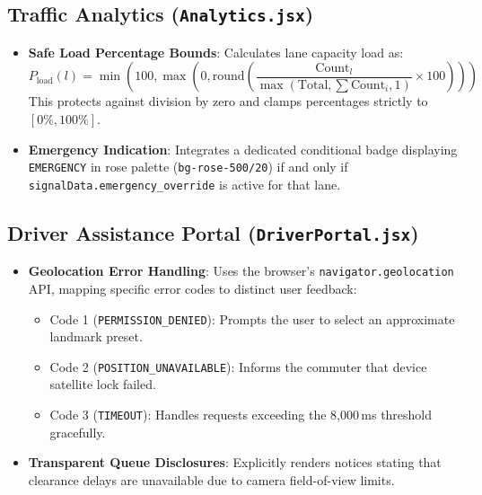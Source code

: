 \subsection{Traffic Analytics (\texttt{Analytics.jsx})}
\begin{itemize}[leftmargin=*]
    \item \textbf{Safe Load Percentage Bounds}: Calculates lane capacity load as:
    \begin{equation}
    P_{\text{load}}(l) = \min\left(100, \max\left(0, \text{round}\left(\frac{\text{Count}_l}{\max(\text{Total}, \sum \text{Count}_i, 1)} \times 100\right)\right)\right)
    \end{equation}
    This protects against division by zero and clamps percentages strictly to $[0\%, 100\%]$.
    \item \textbf{Emergency Indication}: Integrates a dedicated conditional badge displaying \texttt{EMERGENCY} in rose palette (\texttt{bg-rose-500/20}) if and only if \texttt{signalData.emergency\_override} is active for that lane.
\end{itemize}

\subsection{Driver Assistance Portal (\texttt{DriverPortal.jsx})}
\begin{itemize}[leftmargin=*]
    \item \textbf{Geolocation Error Handling}: Uses the browser's \texttt{navigator.geolocation} API, mapping specific error codes to distinct user feedback:
    \begin{itemize}
        \item Code 1 (\texttt{PERMISSION\_DENIED}): Prompts the user to select an approximate landmark preset.
        \item Code 2 (\texttt{POSITION\_UNAVAILABLE}): Informs the commuter that device satellite lock failed.
        \item Code 3 (\texttt{TIMEOUT}): Handles requests exceeding the 8,000\,ms threshold gracefully.
    \end{itemize}
    \item \textbf{Transparent Queue Disclosures}: Explicitly renders notices stating that clearance delays are unavailable due to camera field-of-view limits.
\end{itemize}
